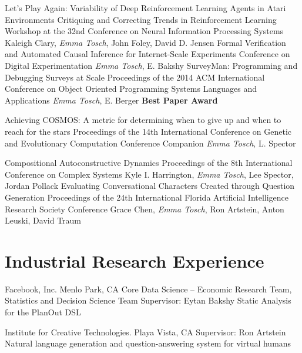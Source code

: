 \documentclass[11pt,a4paper,sans]{moderncv} %
\newcommand{\me}{\emph{Emma Tosch}}
\begin{document}
        {Let's Play Again: Variability of Deep Reinforcement Learning Agents in Atari Environments}
        {}
        {Critiquing and Correcting Trends in Reinforcement Learning Workshop at the 32nd Conference on Neural Information Processing Systems}
        {Kaleigh Clary, \me{}, John Foley, David D. Jensen}
        {}
        {}
        {Formal Verification and Automated Causal Inference for Internet-Scale Experiments}
        {}
        {Conference on Digital Experimentation}
        {\me{}, E. Bakshy}
        {}
        {}
        {SurveyMan: Programming and Debugging Surveys at Scale}
        {}
        {Proceedings of the 2014 ACM International Conference on Object Oriented Programming Systems Languages and Applications}
        {\me{}, E. Berger} 
        {\textbf{Best Paper Award}}
        {}
  
        {Achieving COSMOS: A metric for determining when to give up and when to reach for the stars}
        {}
        {Proceedings of the 14th International Conference on Genetic and Evolutionary Computation Conference Companion}
        {\me{}, L. Spector}
        {}
        {}
  
        {Compositional Autoconstructive Dynamics}
        {}
        {Proceedings of the 8th International Conference on Complex Systems}
        {Kyle I. Harrington, \me{}, Lee Spector, Jordan Pollack}
        {}
        {}
        {Evaluating Conversational Characters Created through Question Generation}
        {}
        {Proceedings of the 24th International Florida Artificial Intelligence Research Society Conference}
        {Grace Chen, \me{}, Ron Artstein, Anton Leuski, David Traum}
        {}
        {}

\section{Industrial Research Experience}

 {Facebook, Inc. Menlo Park, CA}
 {Core Data Science -- Economic Research Team, Statistics and Decision Science Team}
 {Supervisor: Eytan Bakshy}
 {Static Analysis for the PlanOut DSL}
 

  {Institute for Creative Technologies. Playa Vista, CA}
  {}
  {Supervisor: Ron Artstein}
  {Natural language generation and question-answering system for virtual humans}
\end{document}

